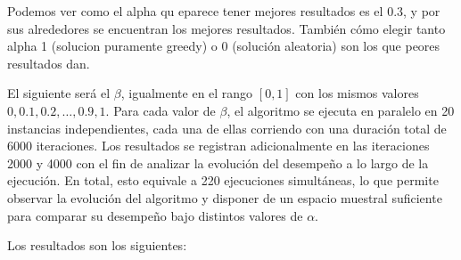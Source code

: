 \documentclass[12pt,a4paper]{book}
\begin{document}
Podemos ver como el alpha qu eparece tener mejores resultados es el 0.3, y por sus alrededores se encuentran los mejores resultados.
También cómo elegir tanto alpha 1 (solucion puramente greedy) o 0 (solución aleatoria) son los que peores resultados dan.

El siguiente será el $\beta$, igualmente en el rango $[0,1]$ con los mismos valores $0, 0.1, 0.2, \dots, 0.9, 1$.  
Para cada valor de $\beta$, el algoritmo se ejecuta en paralelo en 20 instancias independientes, cada una de ellas corriendo con una duración total de 6000 iteraciones. Los resultados se registran adicionalmente en las iteraciones 2000 y 4000 con el fin de analizar la evolución del desempeño a lo largo de la ejecución.
En total, esto equivale a 220 ejecuciones simultáneas, lo que permite observar la evolución del algoritmo y disponer de un espacio muestral suficiente para comparar su desempeño bajo distintos valores de $\alpha$.

Los resultados son los siguientes:
\end{document}
